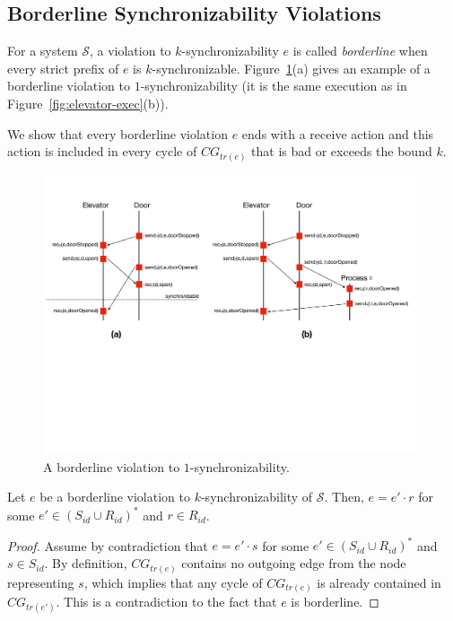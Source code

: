 \subsection{Borderline Synchronizability Violations}\label{ssec:verif1}

For a system $\mathcal{S}$, a violation to $k$-synchronizability $e$ is called \emph{borderline} when every strict prefix of 
$e$ is $k$-synchronizable. Figure~\ref{fig:ex-border-sim}(a) gives an example of a borderline violation to $1$-synchronizability (it is the same execution as in Figure~\ref{fig:elevator-exec}(b)).

We show that every borderline violation $e$ ends with a receive action and this action is included in every cycle of $CG_{tr(e)}$ that is 
bad or exceeds the bound $k$. 

\begin{figure}[t]
\includegraphics[width=11cm]{Borderline-sim.pdf}
\caption{A borderline violation to $1$-synchronizability.}
\label{fig:ex-border-sim}
\end{figure}

\begin{lemma}
Let $e$ be a borderline violation to $k$-synchronizability of $\mathcal{S}$. Then, $e = e'\cdot r$ for some $e'\in (S_{id}\cup R_{id})^*$ and $r\in R_{id}$.
\end{lemma}
\begin{proof}
Assume by contradiction that $e=e'\cdot s$ for some $e'\in (S_{id}\cup R_{id})^*$ and $s\in S_{id}$. By definition, $CG_{tr(e)}$ contains no outgoing
edge from the node representing $s$, which implies that any cycle of $CG_{tr(e)}$ is already contained in $CG_{tr(e')}$. This is a contradiction to 
the fact that $e$ is borderline.
\end{proof}

